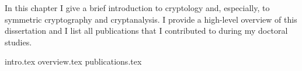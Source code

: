 \myminitoc

In this chapter I give a brief introduction to cryptology and, especially, to symmetric cryptography and cryptanalysis. I provide a high-level overview of this dissertation and I list all publications that I contributed to during my doctoral studies.

{intro.tex}
{overview.tex}
{publications.tex}